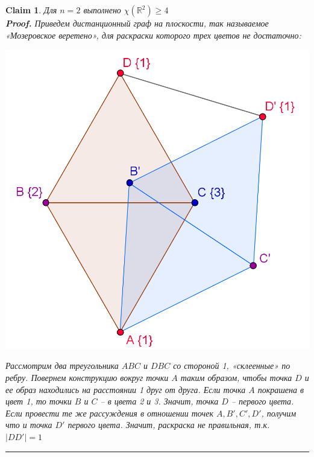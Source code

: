 \documentclass{report}%
\newtheorem{claim}[theorem]{Claim}
\newenvironment{proof}[1][Proof]{\textbf{#1.} }{\ \rule{0.5em}{0.5em}}
\begin{document}
\begin{claim}
		Для $n = 2$ выполнено $\chi(\mathbb{R}^2) \geq 4$ \\
		\begin{proof}
				Приведем дистанционный граф на плоскости, так называемое 
				«Мозеровское веретено», для раскраски которого трех цветов не достаточно:\\
				\begin{center}
						\includegraphics[scale = 0.8]{mozer}
				\end{center}
				
				Рассмотрим два треугольника $ABC$ и $DBC$ со стороной 1, «склеенные» по ребру. 
				Повернем конструкцию вокруг точки $A$  таким образом, чтобы точка $D$ и ее образ 
				находились на расстоянии 1 друг от друга.  Если точка  $A$ покрашена в цвет 
				{1}, то точки $B$ и $C$ – в цвета {2} и {3}. Значит, точка $D$ – первого цвета. Если 
				провести те же рассуждения в отношении точек  $A, B', C', D'$, получим что и точка $D'$
				первого цвета. Значит, раскраска не правильная, т.к. $|DD'| = 1$ 
		\end{proof}
\end{claim}
\end{document}
